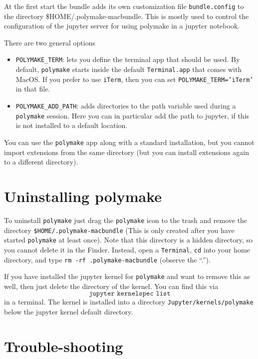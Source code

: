 \documentclass[a4paper]{amsart}
\newcommand{\polymake}{\texttt{polymake}\xspace}
\begin{document}
At the first start the bundle adds its own customization file \texttt{bundle.config} to the directory {\$HOME/.polymake-macbundle}. This is mostly used to control the configuration of the jupyter server for using polymake in a jupyter notebook. 

There are two general options
\begin{itemize}
\item \texttt{POLYMAKE\_TERM}: lets you define the terminal app that should be used. By default, \polymake starts inside the default \texttt{Terminal.app} that comes with MacOS. If you prefer to use \texttt{iTerm}, then you can set \texttt{POLYMAKE\_TERM='iTerm'} in that file. 
\item \texttt{POLYMAKE\_ADD\_PATH}: adds directories to the path variable used during a \polymake session. Here you can in particular add the path to jupyter, if this is not installed to a default location.
\end{itemize}

You can use the \polymake app along with a standard installation, but you cannot import extensions from the same directory (but you can install extensions again to a different directory).

\section*{Uninstalling polymake}

To uninstall \polymake just drag the \polymake icon to the trash and remove the directory \texttt{\${HOME}/.polymake-macbundle} (This is only created after you have started \polymake at least once). Note that this directory is a hidden directory, so you cannot delete it in the Finder. Instead, open a \texttt{Terminal}, \texttt{cd} into your home directory, and type \texttt{rm -rf .polymake-macbundle} (observe the ``.'').

If you have installed the jupyter kernel for \polymake and want to remove this as well, then just delete the directory of the kernel. You can find this via
\[\texttt{jupyter kernelspec list}\]
in a terminal. The kernel is installed into a directory \texttt{Jupyter/kernels/polymake} below the jupyter kernel default directory.

\section*{Trouble-shooting}
\end{document}
